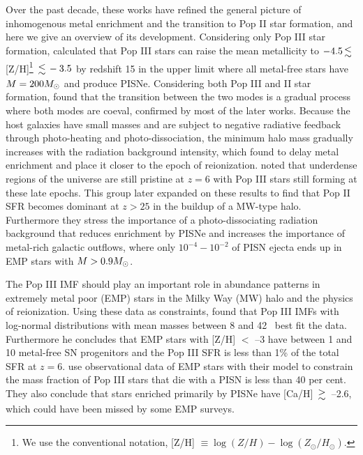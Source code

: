 \documentclass[useAMS,usenatbib]{mn2e}
\begin{document}
Over the past decade, these works have refined the general picture of
inhomogenous metal enrichment and the transition to Pop II star
formation, and here we give an overview of its development.
Considering only Pop III star formation, \citeauthor{Yoshida04}
calculated that Pop III stars can raise the mean metallicity to $-4.5
\la$ [Z/H]\footnote{We use the conventional notation, [Z/H] $\equiv
  \log(Z/H) - \log(Z_\odot/H_\odot)$.} $\la -3.5$ by redshift 15 in
the upper limit where all metal-free stars have $M = 200 \Ms$ and
produce PISNe.  Considering both Pop III and II star formation,
\citeauthor{Scannapieco03} found that the transition between the two
modes is a gradual process where both modes are coeval, confirmed by
most of the later works.  Because the host galaxies have small masses
and are subject to negative radiative feedback through photo-heating
and photo-dissociation, the minimum halo mass gradually increases with
the radiation background intensity, which
\citeauthor{Furlanetto05_Reion} found to delay metal enrichment and
place it closer to the epoch of reionization.  \citeauthor{Trenti09}
noted that underdense regions of the universe are still pristine at
$z=6$ with Pop III stars still forming at these late epochs.  This
group later expanded on these results to find that Pop II SFR becomes
dominant at $z>25$ in the buildup of a MW-type halo.  Furthermore they
stress the importance of a photo-dissociating radiation background
that reduces enrichment by PISNe and increases the importance of
metal-rich galactic outflows, where only $10^{-4} - 10^{-2}$ of PISN
ejecta ends up in EMP stars with $M > 0.9 \Ms$.

The Pop III IMF should play an important role in abundance patterns in
extremely metal poor (EMP) stars in the Milky Way (MW) halo and the
physics of reionization.  Using these data as constraints,
\citeauthor{Tumlinson06} found that Pop III IMFs with log-normal
distributions with mean masses between 8 and 42 \Ms~best fit the data.
Furthermore he concludes that EMP stars with [Z/H] $<$ --3 have
between 1 and 10 metal-free SN progenitors and the Pop III SFR is less
than 1\% of the total SFR at $z=6$.  \citeauthor{Karlsson08} use
observational data of EMP stars with their model to constrain the mass
fraction of Pop III stars that die with a PISN is less than 40 per
cent.  They also conclude that stars enriched primarily by PISNe have
[Ca/H] $\ga$ --2.6, which could have been missed by some EMP
surveys.

%
\end{document}
